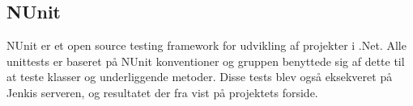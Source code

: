 \subsection{NUnit}
NUnit er et open source testing framework for udvikling af projekter i .Net. Alle unittests er baseret på NUnit konventioner og gruppen benyttede sig af dette til at teste klasser og underliggende metoder. Disse tests blev også eksekveret på Jenkis serveren, og resultatet der fra vist på projektets forside.

%
%
%
